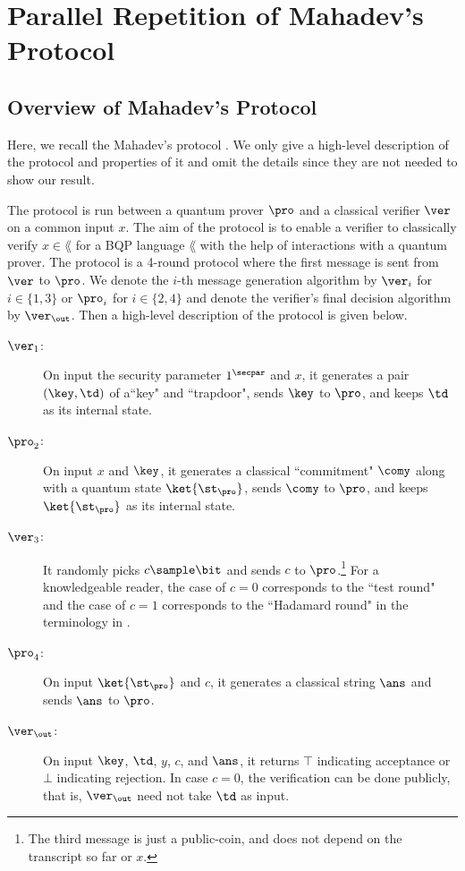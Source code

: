 \section{Parallel Repetition of Mahadev's Protocol}

\subsection{Overview of Mahadev's Protocol}\label{sec:mahadev_overview}
Here, we recall the Mahadev's protocol \cite{FOCS:Mahadev18a}. We only give a high-level description of the protocol and properties of it and omit the details since they are not needed to show our result. 

The protocol is run between a quantum prover $\pro$ and a classical verifier $\ver$ on a common input $x$. The aim of the protocol is to enable a verifier to classically verify $x\in \lang$ for a BQP language $\lang$ with the help of interactions with a quantum prover.
The protocol is a 4-round protocol where the first message is sent from $\ver$ to $\pro$. 
We denote the $i$-th message generation algorithm by $\ver_i$ for $i\in\{1,3\}$ or $\pro_i$ for $i\in \{2,4\}$ and denote the verifier's final decision algorithm by $\ver_\out$.
Then a high-level description of the protocol is given below.
\begin{description}
\item[$\ver_1$:] On input the security parameter $1^\secpar$ and $x$, it generates a pair $(\key,\td)$ of a``key" and ``trapdoor", sends $\key$ to $\pro$, and keeps $\td$ as its internal state.
\item[$\pro_2$:] On input $x$ and $\key$, it generates a classical ``commitment" $\comy$ along with a quantum state $\ket{\st_\pro}$, sends $\comy$ to $\pro$, and keeps $\ket{\st_\pro}$ as its internal state.
\item[$\ver_3$:] It randomly picks $c\sample \bit$ and sends $c$ to $\pro$.\footnote{The third message is just a public-coin, and does not depend on the transcript so far or $x$.}
For a knowledgeable reader, the case of $c=0$ corresponds to the ``test round" and the case of $c=1$ corresponds to the ``Hadamard round" in the terminology in \cite{FOCS:Mahadev18a}.
\item[$\pro_4$:] On input $\ket{\st_\pro}$ and $c$, it generates a classical string $\ans$ and sends $\ans$ to $\pro$.
\item[$\ver_\out$:] On input $\key$, $\td$, $y$, $c$, and $\ans$, it returns $\top$ indicating acceptance or $\bot$ indicating rejection.
In case $c=0$, the verification can be done publicly, that is, $\ver_\out$ need not take $\td$ as input.
\end{description}

